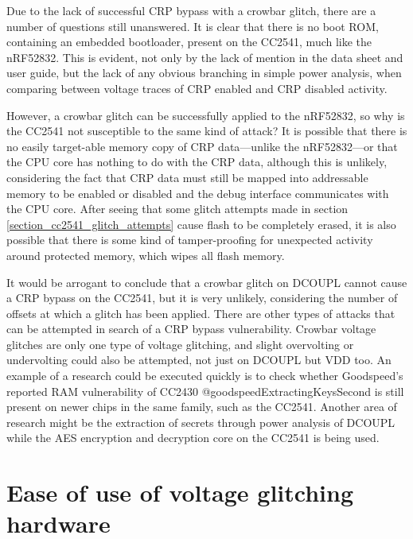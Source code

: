 Due to the lack of successful CRP bypass with a crowbar glitch, there
are a number of questions still unanswered. It is clear that there is no
boot ROM, containing an embedded bootloader, present on the CC2541, much
like the nRF52832. This is evident, not only by the lack of mention in
the data sheet and user guide, but the lack of any obvious branching in
simple power analysis, when comparing between voltage traces of CRP
enabled and CRP disabled activity.

However, a crowbar glitch can be successfully applied to the nRF52832,
so why is the CC2541 not susceptible to the same kind of attack? It is
possible that there is no easily target-able memory copy of CRP
data---unlike the nRF52832---or that the CPU core has nothing to do with
the CRP data, although this is unlikely, considering the fact that CRP
data must still be mapped into addressable memory to be enabled or
disabled and the debug interface communicates with the CPU core. After
seeing that some glitch attempts made in section
\ref{section_cc2541_glitch_attempts} cause flash to be completely
erased, it is also possible that there is some kind of tamper-proofing
for unexpected activity around protected memory, which wipes all flash
memory.

It would be arrogant to conclude that a crowbar glitch on DCOUPL cannot
cause a CRP bypass on the CC2541, but it is very unlikely, considering
the number of offsets at which a glitch has been applied. There are
other types of attacks that can be attempted in search of a CRP bypass
vulnerability. Crowbar voltage glitches are only one type of voltage
glitching, and slight overvolting or undervolting could also be
attempted, not just on DCOUPL but VDD too. An example of a research
could be executed quickly is to check whether Goodspeed's reported RAM
vulnerability of CC2430 @goodspeedExtractingKeysSecond is still present
on newer chips in the same family, such as the CC2541. Another area of
research might be the extraction of secrets through power analysis of
DCOUPL while the AES encryption and decryption core on the CC2541 is
being used.

\hypertarget{ease-of-use-of-voltage-glitching-hardware}{%
\section{\texorpdfstring{Ease of use of voltage glitching
hardware\label{section_ease_of_use}}{Ease of use of voltage glitching hardware}}\label{ease-of-use-of-voltage-glitching-hardware}}

